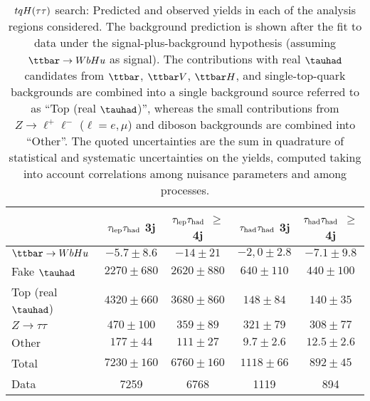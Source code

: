 \begin{table}[htbp]
\small
\begin{center}
\begin{tabular}{l*{4}{c}}
\hline\hline
 & $\tau_{\mathrm{lep}} \tau_{\mathrm{had}}$ 3j & $\tau_{\mathrm{lep}} \tau_{\mathrm{had}}$ $\geq$4j & $\tau_{\mathrm{had}} \tau_{\mathrm{had}}$ 3j &  $\tau_{\mathrm{had}} \tau_{\mathrm{had}}$ $\geq$4j \\
\hline
$\Hu$  &   $ -5.7 \pm 8.6 $ &   $ -14 \pm 21 $ &   $ -2,0 \pm 2.8 $ &   $ -7.1 \pm 9.8 $ \\ 
\hline
Fake $\tauhad$  &   $ 2270 \pm 680 $ &   $ 2620 \pm 880 $ &   $ 640 \pm 110 $ &   $ 440 \pm 100 $ \\
Top (real $\tauhad$)  &   $ 4320 \pm 660 $ &   $ 3680 \pm 860 $ &   $ 148 \pm 84 $ &   $ 140 \pm 35 $ \\ 
$Z \to \tau\tau$  &   $ 470 \pm 100 $ &   $ 359 \pm 89 $ &   $ 321 \pm 79 $ &   $ 308 \pm 77 $ \\ 
Other  &   $ 177 \pm 44 $ &   $ 111 \pm 27 $ &   $ 9.7 \pm 2.6 $ &   $ 12.5 \pm 2.6 $ \\ 
\hline
Total  &   $ 7230 \pm 160 $ &   $ 6760 \pm 160 $ &   $ 1118 \pm 66 $ &   $ 892 \pm 45 $ \\ 
\hline
Data  & 7259  & 6768  & 1119  & 894  \\ 
\hline\hline    
\end{tabular}

%
\end{center}
\caption{
$tqH(\tau\tau)$ search: Predicted and observed yields in each of the analysis regions considered.
The background prediction is shown after the fit to data under the signal-plus-background hypothesis 
(assuming $\Hu$ as signal).
The contributions with real $\tauhad$ candidates from $\ttbar$,  $\ttbar V$, $\ttbar H$, and single-top-quark backgrounds are combined into
a single background source referred to as ``Top (real $\tauhad$)'', whereas the small contributions from 
$Z\to \ell^+\ell^-$ ($\ell = e, \mu$) and diboson backgrounds are combined into ``Other''. 
The quoted uncertainties are the sum in quadrature of statistical and systematic uncertainties on the yields, 
computed taking into account correlations among nuisance parameters and among processes.
}
\label{tab:Htautau_Postfit_Yields_Unblind_Hu}
\end{table} 
